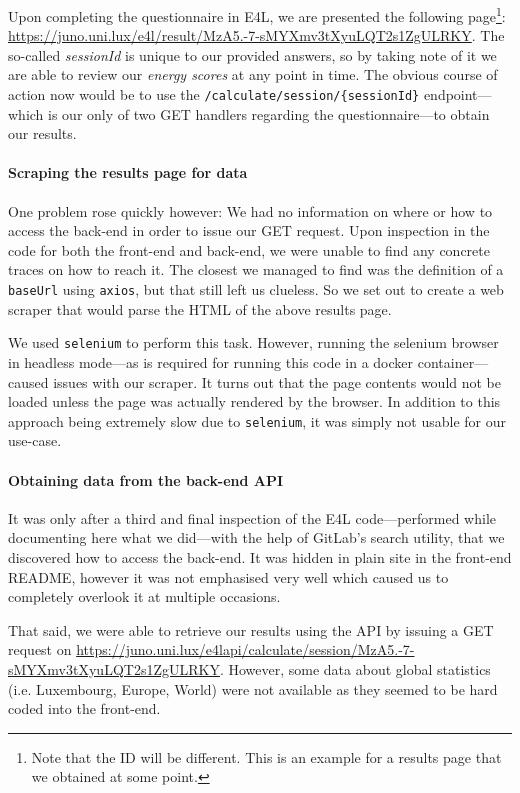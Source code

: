 Upon completing the questionnaire in E4L, we are presented the
following page\footnote{Note that the ID will be different. This is an
example for a results page that we obtained at some point.}:
\url{https://juno.uni.lux/e4l/result/MzA5.-7-sMYXmv3tXyuLQT2s1ZgULRKY}.
The so-called	\textit{sessionId} is unique to our provided answers, so
by taking note of it we are able to review our \textit{energy scores}
at any point in time. The obvious course of action now would be to use
the \verb|/calculate/session/{sessionId}| endpoint---which is our only
of two GET handlers regarding the questionnaire---to obtain our
results.

\paragraph{Scraping the results page for data}

One problem rose quickly however: We had no information on where or
how to access the back-end in order to issue our GET request. Upon
inspection in the code for both the front-end and back-end, we were
unable to find any concrete traces on how to reach it. The closest we
managed to find was the definition of a \verb|baseUrl| using \verb|axios|,
but that still left us clueless. So we set out to create a web scraper
that would parse the HTML of the above results page.

We used \verb|selenium| to perform this task. However, running the
selenium browser in headless mode---as is required for running this
code in a docker container---caused issues with our scraper. It turns
out that the page contents would not be loaded unless the page was
actually rendered by the browser. In addition to this approach being
extremely slow due to \verb|selenium|, it was simply not usable for
our use-case.

\paragraph{Obtaining data from the back-end API}

It was only after a third and final inspection of the E4L
code---performed while documenting here what we did---with the help of
GitLab's search utility, that we discovered how to access the
back-end.  It was hidden in plain site in the front-end README,
however it was not emphasised very well which caused us to completely
overlook it at multiple occasions.

That said, we were able to retrieve our results using the API by
issuing a GET request on
\url{https://juno.uni.lux/e4lapi/calculate/session/MzA5.-7-sMYXmv3tXyuLQT2s1ZgULRKY}.
However, some data about global statistics (i.e. Luxembourg, Europe,
World) were not available as they seemed to be hard coded into the
front-end.


